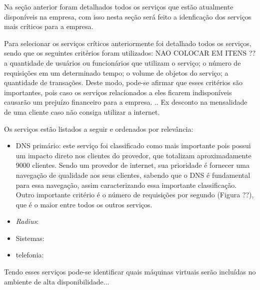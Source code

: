Na seção anterior foram detalhados todos os serviços que estão atualmente disponíveis na empresa, com isso nesta seção será feito a idenficação
dos serviços mais críticos para a empresa.

Para selecionar os serviços críticos anteriormente foi detalhado todos os serviços, sendo que os seguintes critérios foram utilizados: 
NAO COLOCAR EM ITENS ?? 
a quantidade de usuários ou funcionários que utilizam o serviço; 
o número de requisições em um determinado tempo;
o volume de objetos do serviço;
a quantidade de transações.
Deste modo, pode-se afirmar que esses critérios são importantes, pois caso os serviços relacionados a eles ficarem indisponíveis causarão 
um prejuízo financeiro para a empresa. 
.. Ex desconto na mensalidade de uma cliente caso não consiga utilizar a internet.

Os serviços estão listados a seguir e ordenados por relevância:
\begin{itemize}
 \item \ac{DNS} primário: este serviço foi classificado como mais importante pois possui um impacto direto nos clientes do provedor, que 
 totalizam aproximadamente 9000 clientes. Sendo um provedor de internet, sua prioridade é fornecer uma navegação de qualidade aos seus clientes, 
 sabendo que o \ac{DNS} é fundamental para essa navegação, assim caracterizando essa importante classificação. Outro importante critério é
 o número de requisições por segundo (Figura ??), que é o maior entre todos os outros serviços.
 \item \textit{Radius}: 
 \item Sistemas: 
 \item telefonia: 
\end{itemize}

Tendo esses serviços pode-se identificar quais máquinas virtuais serão incluídas no ambiente de alta disponibilidade...


